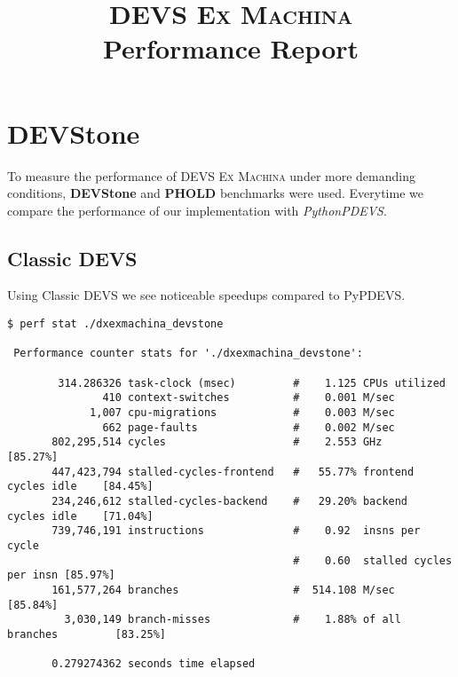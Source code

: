 \documentclass[10pt,a4paper]{report}
\date{}
\title{\textsc{DEVS Ex Machina} \\ Performance Report}
\begin{document}
\maketitle

\chapter*{DEVStone}
To measure the performance of \textsc{DEVS Ex Machina} under more demanding conditions, \textbf{DEVStone} and \textbf{PHOLD} benchmarks were used. Everytime we compare the performance of our implementation with \textit{PythonPDEVS}.\\

\section{Classic DEVS}
Using Classic DEVS we see noticeable speedups compared to PyPDEVS.
\begin{Verbatim}[fontsize=\small]
$ perf stat ./dxexmachina_devstone 

 Performance counter stats for './dxexmachina_devstone':

        314.286326 task-clock (msec)         #    1.125 CPUs utilized          
               410 context-switches          #    0.001 M/sec                  
             1,007 cpu-migrations            #    0.003 M/sec                  
               662 page-faults               #    0.002 M/sec                  
       802,295,514 cycles                    #    2.553 GHz                     [85.27%]
       447,423,794 stalled-cycles-frontend   #   55.77% frontend cycles idle    [84.45%]
       234,246,612 stalled-cycles-backend    #   29.20% backend  cycles idle    [71.04%]
       739,746,191 instructions              #    0.92  insns per cycle        
                                             #    0.60  stalled cycles per insn [85.97%]
       161,577,264 branches                  #  514.108 M/sec                   [85.84%]
         3,030,149 branch-misses             #    1.88% of all branches         [83.25%]

       0.279274362 seconds time elapsed
\end{Verbatim}
\end{document}
